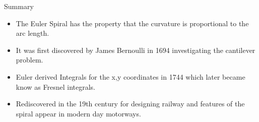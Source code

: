 \documentclass{beamer}
\begin{document}
\begin{frame}{Summary}
	\begin{itemize}
		\item The Euler Spiral has the property that the curvature is proportional to the arc length.
		\item It was first discovered by James Bernoulli in 1694 investigating the cantilever problem.
		\item Euler derived Integrals for the x,y coordinates in 1744 which later became know as Fresnel integrals.
		\item Rediscovered in the 19th century for designing railway and features of the spiral appear in modern day motorways.
	\end{itemize}

\end{frame}
\end{document}
